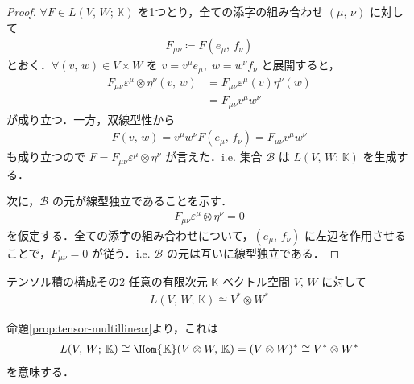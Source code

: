 \documentclass[geometry_main]{subfiles}
\begin{document}
\begin{proof}
	$\forall F  \in L(V,\, W;\, \mathbb{K})$ を1つとり，全ての添字の組み合わせ $(\mu,\, \nu)$ に対して
	\begin{align}
		F_{\mu\nu} \coloneqq F(e_\mu,\, f_\nu)
	\end{align}
	とおく．$\forall (v,\, w) \in V \times W$ を $v = v^\mu e_\mu,\; w = w^\nu f_\nu$ と展開すると，
	\begin{align}
		F_{\mu\nu} \varepsilon^\mu \otimes \eta^\nu (v,\, w) &= F_{\mu\nu} \varepsilon^{\mu}(v) \eta^\nu(w) \\
		&= F_{\mu\nu} v^\mu w^\nu
	\end{align}
	が成り立つ．一方，双線型性から
	\begin{align}
		F(v,\, w) = v^\mu w^\nu F(e_\mu,\, f_\nu) = F_{\mu\nu} v^\mu w^\nu
	\end{align}
	も成り立つので $F = F_{\mu\nu} \varepsilon^\mu \otimes \eta^\nu$ が言えた．i.e. 集合 $\mathcal{B}$ は $L(V,\, W;\, \mathbb{K})$ を生成する．

	次に，$\mathcal{B}$ の元が線型独立であることを示す．
	\begin{align}
		F_{\mu\nu} \varepsilon^\mu \otimes \eta^\nu = 0
	\end{align}
	を仮定する．全ての添字の組み合わせについて，$(e_\mu,\, f_\nu)$ に左辺を作用させることで，$F_{\mu\nu} = 0$ が従う．i.e. $\mathcal{B}$ の元は互いに線型独立である．
\end{proof}


\begin{myprop}[label=prop:fin-tensor-dual]{テンソル積の構成その2}
	任意の\underline{有限次元} $\mathbb{K}$-ベクトル空間 $V,\, W$ に対して
    \begin{align}
		L(V,\, W;\, \mathbb{K}) \cong V^* \otimes W^*
	\end{align}
\end{myprop}

\begin{marker}
    命題\ref{prop:tensor-multillinear}より，これは 
    \begin{align}
        L(V,\, W;\, \mathbb{K}) \cong \Hom{\mathbb{K}}(V \otimes W,\, \mathbb{K}) = (V \otimes W)^* \cong V^* \otimes W^*
    \end{align}
    を意味する．
\end{marker}
\end{document}
